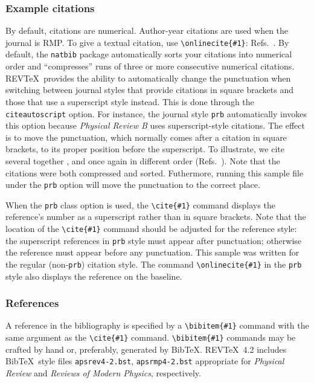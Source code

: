 \documentclass[%
 reprint,
 amsmath,amssymb,
 aps,
]{revtex4-2}
\begin{document}
\subsubsection{Example citations}
By default, citations are numerical\cite{Beutler1994}.
Author-year citations are used when the journal is RMP. 
To give a textual citation, use \verb+\onlinecite{#1}+: 
Refs.~. 
By default, the \texttt{natbib} package automatically sorts your citations into numerical order and ``compresses'' runs of three or more consecutive numerical citations.
REV\TeX\ provides the ability to automatically change the punctuation when switching between journal styles that provide citations in square brackets and those that use a superscript style instead. This is done through the \texttt{citeautoscript} option. For instance, the journal style \texttt{prb} automatically invokes this option because \textit{Physical 
Review B} uses superscript-style citations. The effect is to move the punctuation, which normally comes after a citation in square brackets, to its proper position before the superscript. 
To illustrate, we cite several together 
\cite{[See the explanation of time travel in ]feyn54,*[The classical relativistic treatment of ][ is a relative classic]epr,witten2001,Berman1983,Davies1998,Bire82}, 
and once again in different order (Refs.~\cite{epr,feyn54,Bire82,Berman1983,witten2001,Davies1998}). 
Note that the citations were both compressed and sorted. Futhermore, running this sample file under the \texttt{prb} option will move the punctuation to the correct place.

When the \verb+prb+ class option is used, the \verb+\cite{#1}+ command
displays the reference's number as a superscript rather than in
square brackets. Note that the location of the \verb+\cite{#1}+
command should be adjusted for the reference style: the superscript
references in \verb+prb+ style must appear after punctuation;
otherwise the reference must appear before any punctuation. This
sample was written for the regular (non-\texttt{prb}) citation style.
The command \verb+\onlinecite{#1}+ in the \texttt{prb} style also
displays the reference on the baseline.

\subsubsection{References}
A reference in the bibliography is specified by a \verb+\bibitem{#1}+ command
with the same argument as the \verb+\cite{#1}+ command.
\verb+\bibitem{#1}+ commands may be crafted by hand or, preferably,
generated by Bib\TeX. 
REV\TeX~4.2 includes Bib\TeX\ style files
\verb+apsrev4-2.bst+, \verb+apsrmp4-2.bst+ appropriate for
\textit{Physical Review} and \textit{Reviews of Modern Physics},
respectively.
\end{document}
